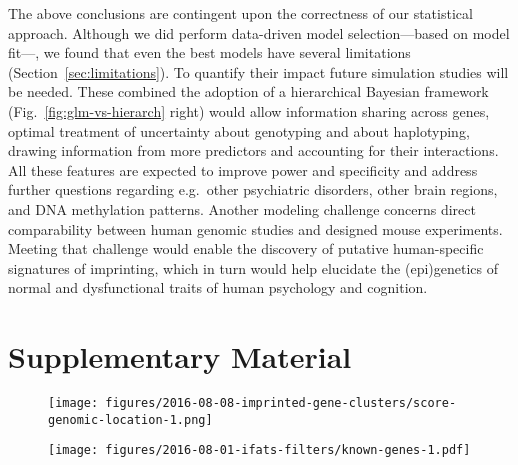 \documentclass[letterpaper]{article}
\begin{document}
The above conclusions are contingent upon the correctness of our statistical
approach.  Although we did perform data-driven model selection---based on
model fit---, we found that even the best models have several limitations
(Section~\ref{sec:limitations}).  To quantify their impact future simulation
studies will be needed.  These combined the adoption of a hierarchical
Bayesian framework (Fig.~\ref{fig:glm-vs-hierarch} right) would allow
information sharing across genes, optimal treatment of uncertainty about
genotyping and about haplotyping, drawing information from more predictors and
accounting for their interactions.  All these features are expected to improve
power and specificity and address further questions regarding e.g.~other
psychiatric disorders, other brain regions, and DNA methylation patterns.
Another modeling challenge concerns direct comparability between human genomic
studies and designed mouse experiments.  Meeting that challenge would enable
the discovery of putative human-specific signatures of imprinting, which in
turn would help elucidate the (epi)genetics of normal and dysfunctional traits
of human psychology and cognition.




\newpage

\section{Supplementary Material}

\newpage


\setcounter{figure}{0}
\makeatletter 
\renewcommand{\thefigure}{S\@arabic\c@figure}
\makeatother

\begin{figure}
\begin{center}
\texttt{[image: figures/2016-08-08-imprinted-gene-clusters/score-genomic-location-1.png]}
\end{center}
\caption{}
\label{fig:clusters}
\end{figure}

\begin{figure}
\begin{center}
\texttt{[image: figures/2016-08-01-ifats-filters/known-genes-1.pdf]}
\caption{}
\label{fig:known-genes}
\end{center}
\end{figure}
\end{document}
